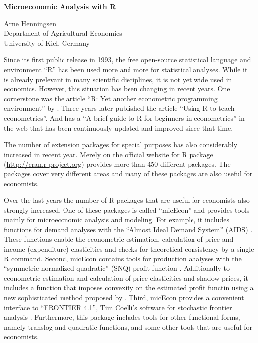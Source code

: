 \documentclass[12pt,english]{article}
\begin{document}
\begin{center}\textbf{\LARGE Microeconomic Analysis with R}\end{center}{\LARGE \par}

\begin{center}Arne Henningsen\\
Department of Agricultural Economics\\
University of Kiel, Germany\end{center}

Since its first public release in 1993, the free open-source statistical
language and environment ``R'' \citep{r-project} has been used more
and more for statistical analyses. 
While it is already prelevant in many scientific disciplines, 
it is not yet wide used in economics.
However, this situation has been changing in recent years. 
One cornerstone was the article ``R: Yet another econometric programming
environment'' by \citet{cribari99}.
Three years later \citet{racine02} published the article ``Using R to teach
econometrics''. 
And \citet{arai02} has a ``A brief guide to R for beginners in econometrics''
in the web that has been continuously updated and improved since that time.

The number of extension packages for special purposes has also considerably 
increased in recent year.
Merely on the official website for R package (\url{http://cran.r-project.org})
provides more than 450 different packages.
The packages cover very different areas and many of these packages are also 
useful for economists.

Over the last years the number of R packages that are useful for economists
also strongly increased. 
One of these packages is called ``micEcon'' \citep{r-micecon} and provides
tools mainly for microeconomic analysis and modeling.
For example, it includes functions for demand analyses with the 
``Almost Ideal Demand System'' (AIDS) \citep{deaton80a}.
These functions enable the econometric estimation, calculation of price and
income (expenditure) elasticities and checks for theoretical consistency
by a single R command.
Second, micEcon contains tools for production analyses with the 
``symmetric normalized quadratic'' (SNQ) profit function
\citep{diewert87,diewert92,kohli93}.  
Additionally to econometric estimation and calculation of price elasticities
and shadow prices, it includes a function that imposes convexity on the 
estimated profit functin using a new sophisticated method proposed by
\citet{koebel03}.
Third, micEcon provides a convenient interface to ``FRONTIER 4.1'', Tim 
Coelli's software for stochastic frontier analysis \citep{coelli96}.
Furthermore, this package includes tools for other functional forms, namely 
translog and quadratic functions, and some other tools that are useful
for economists.
\end{document}
